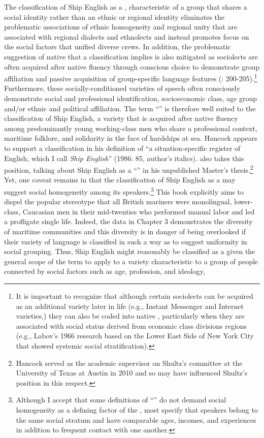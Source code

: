 The classification of Ship English as a , characteristic of a group that shares a social identity rather than an ethnic or regional identity \citep[122]{Trudgill2003} eliminates the problematic associations of ethnic homogeneity and regional unity that are associated with regional dialects and ethnolects and instead promotes focus on the social factors that unified diverse crews. In addition, the problematic suggestion of native  that a  classification implies is also mitigated as sociolects are often acquired after native fluency through conscious choice to demonstrate group affiliation and passive acquisition of group-specific language features (\citealt{Durrell2004}: 200-205).\footnote{It is important to recognize that although certain sociolects can be acquired as an additional variety later in life (e.g., Instant Messenger and Internet varieties,) they can also be coded into native , particularly when they are associated with social status derived from economic class divisions regions (e.g., Labov’s 1966 research based on the Lower East Side of New York City that showed systemic social stratification).}  Furthermore, these socially-conditioned varieties of speech often consciously demonstrate social and professional identification, socioeconomic class, age group and/or ethnic and political affiliation. The term “” is therefore well suited to the classification of Ship English, a variety that is acquired after native fluency among predominantly young working-class men who share a professional context, maritime folklore, and solidarity in the face of hardships at sea. Hancock appears to support a  classification in his definition of “a situation-specific register of English, which I call \textit{Ship English}” (1986: 85, author’s italics). \citet{Schultz2010} also takes this position, talking about Ship English as a “” in his unpublished Master’s thesis.\footnote{Hancock served as the academic supervisor on Shultz’s committee at the University of Texas at Austin in 2010 and so may have influenced Shultz’s position in this respect.}  Yet, one caveat remains in that the classification of Ship English as a  may suggest social homogeneity among its speakers.\footnote{Although I accept that some definitions of “” do not demand social homogeneity as a defining factor of the , most specify that speakers belong to the same social stratum and have comparable ages, incomes, and experiences in addition to frequent contact with one another.}  This book explicitly aims to dispel the popular stereotype that all British mariners were monolingual, lower-class, Caucasian men in their mid-twenties who performed manual labor and led a profligate single life. Indeed, the data in Chapter 3 demonstrates the diversity of maritime communities and this diversity is in danger of being overlooked if their variety of language is classified in such a way as to suggest uniformity in social grouping. Thus, Ship English might reasonably be classified as a  given the general scope of the term to apply to a variety characteristic to a group of people connected by social factors such as age, profession, and ideology, 